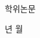 \begin{titlepage}
  \centering
  \vspace*{10mm}
  {\large \DegreeKo 학위논문\par}
  \vspace{30mm}
  {\LARGE\bfseries \ThesisTitleKo\par}
  \vspace{8mm}
  {\large \ThesisTitleEn\par}
  \vfill
  {\large \SubmitYear 년 \SubmitMonth 월\par}
  \vspace{20mm}
  {\large \UniversityKo\par}
  {\large \DepartmentKo\par}
  \vspace{8mm}
  {\Large \AuthorKo\par}
  \vspace*{10mm}
\end{titlepage}

